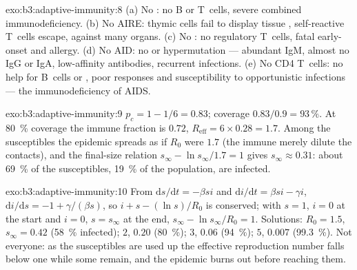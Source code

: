 \begin{solution}{exo:b3:adaptive-immunity:8}
(a) No : no B or T~cells, severe combined
immunodeficiency. (b) No AIRE: thymic cells fail to display tissue
, self-reactive T~cells escape,  against many
organs. (c) No : no regulatory T~cells, fatal early-onset
 and allergy. (d) No AID: no  or
hypermutation --- abundant IgM, almost no IgG or IgA, low-affinity
antibodies, recurrent infections. (e) No CD4 T~cells: no help for
B~cells or , poor  responses and susceptibility to
opportunistic infections --- the immunodeficiency of AIDS.
\end{solution}

\begin{solution}{exo:b3:adaptive-immunity:9}
$p_{c} = 1 - 1/6 = 0.83$; coverage $0.83/0.9 = 93\,\%$. At \qty{80}{\%}
coverage the immune fraction is $0.72$, $R_{\text{eff}} = 6\times 0.28
= 1.7$. Among the susceptibles the epidemic spreads as if $R_{0}$ were
$1.7$ (the immune merely dilute the contacts), and the final-size
relation $s_{\infty} - \ln s_{\infty}/1.7 = 1$ gives $s_{\infty}
\approx 0.31$: about \qty{69}{\%} of the susceptibles, \qty{19}{\%} of
the population, are infected.
\end{solution}

\begin{solution}{exo:b3:adaptive-immunity:10}
From $\mathrm{d}s/\mathrm{d}t = -\beta si$ and $\mathrm{d}i/\mathrm{d}t
= \beta si - \gamma i$, $\mathrm{d}i/\mathrm{d}s = -1 + \gamma/(\beta s)$,
so $i + s - (\ln s)/R_{0}$ is conserved; with $s = 1$, $i = 0$ at the
start and $i = 0$, $s = s_{\infty}$ at the end, $s_{\infty} - \ln
s_{\infty}/R_{0} = 1$. Solutions: $R_{0} = 1.5$, $s_{\infty} = 0.42$
(\qty{58}{\%} infected); $2$, $0.20$ (\qty{80}{\%}); $3$, $0.06$
(\qty{94}{\%}); $5$, $0.007$ (\qty{99.3}{\%}). Not everyone: as the
susceptibles are used up the effective reproduction number falls below
one while some remain, and the epidemic burns out before reaching them.
\end{solution}

